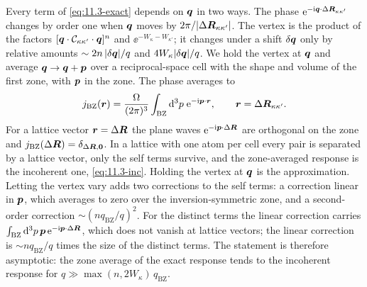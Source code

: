 Every term of \cref{eq:11.3-exact} depends on $\bm{q}$ in two ways. The phase $\mathrm{e}^{-\mathrm{i}\bm{q}\cdot\Delta\bm{R}_{\kappa\kappa'}}$ changes by order one when $\bm{q}$ moves by $2\pi/|\Delta\bm{R}_{\kappa\kappa'}|$. The vertex is the product of the factors $[\bm{q}\cdot\mathcal{C}_{\kappa\kappa'}\cdot\bm{q}]^n$ and $\ee^{-W_\kappa - W_{\kappa'}}$; it changes under a shift $\delta\bm{q}$ only by relative amounts $\sim 2n\,|\delta\bm{q}|/q$ and $4W_\kappa|\delta\bm{q}|/q$. We hold the vertex at $\bm{q}$ and average $\bm{q} \to \bm{q} + \bm{p}$ over a reciprocal-space cell with the shape and volume of the first zone, with $\bm{p}$ in the zone. The phase averages to
\begin{equation}
  j_{\mathrm{BZ}}(\bm{r}) = \frac{\Omega}{(2\pi)^3}\int_{\mathrm{BZ}}\mathrm{d}^3p\;\mathrm{e}^{-\mathrm{i}\bm{p}\cdot\bm{r}} , \qquad \bm{r} = \Delta\bm{R}_{\kappa\kappa'} .
  \label{eq:D.31-jBZ}
\end{equation}
For a lattice vector $\bm{r} = \Delta\bm{R}$ the plane waves $\mathrm{e}^{-\mathrm{i}\bm{p}\cdot\Delta\bm{R}}$ are orthogonal on the zone and $j_{\mathrm{BZ}}(\Delta\bm{R}) = \delta_{\Delta\bm{R},\bm{0}}$. In a lattice with one atom per cell every pair is separated by a lattice vector, only the self terms survive, and the zone-averaged response is the incoherent one, \cref{eq:11.3-inc}. Holding the vertex at $\bm{q}$ is the approximation. Letting the vertex vary adds two corrections to the self terms: a correction linear in $\bm{p}$, which averages to zero over the inversion-symmetric zone, and a second-order correction $\sim (nq_{\mathrm{BZ}}/q)^2$. For the distinct terms the linear correction carries $\int_{\mathrm{BZ}}\mathrm{d}^3p\,\bm{p}\,\mathrm{e}^{-\mathrm{i}\bm{p}\cdot\Delta\bm{R}}$, which does not vanish at lattice vectors; the linear correction is $\sim nq_{\mathrm{BZ}}/q$ times the size of the distinct terms. The statement is therefore asymptotic: the zone average of the exact response tends to the incoherent response for $q \gg \max(n, 2W_\kappa)\,q_{\mathrm{BZ}}$.

